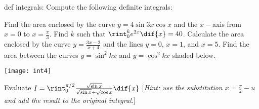 def integrals:
  \questioM Compute the following definite integrals:
  \questioM Find the area enclosed by the curve $ y = 4 \sin 3x \cos x $ and the $ x-$axis from $ x = 0 $
            to $ x = \frac{\pi}{3} $.
  \questioE Find $ k $ such that $ \rint^k_0 e^{2x} \dif{x} = 40 $.
  \questioE Calculate the area enclosed by the curve $ y = \frac{3x - 2}{x + 4} $ and the lines $ y = 0 $, $ x = 1 $,
            and $ x = 5 $.
  \questioE Find the area between the curves $ y = \sin^2 kx $ and $ y = \cos^2 kx $ shaded below.
            \begin{center}
              \texttt{[image: int4]}
            \end{center}
  \questioS Evaluate $ I = \rint^{\pi/2}_0 \frac{\sqrt{\sin x}}{\sqrt{\sin x} + \sqrt{\cos x}} \dif{x} $ [\textit{Hint: use the
            substitution $ x = \frac{\pi}{2} - u $ and add the result to the original integral.}]


